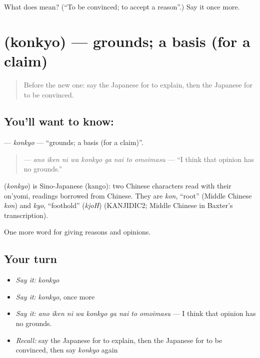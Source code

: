 \begin{tcolorbox}[breakable,colback=teal!4,colframe=teal!35!black,title={Before you move on}]
What does  mean? (\textquotedblleft{}To be convinced; to accept a reason\textquotedblright{}.) Say it once more.
\end{tcolorbox}
\section[\texorpdfstring{\ja{こんきょ} (konkyo)}{こんきょ (konkyo)}]{ (konkyo) — grounds; a basis (for a claim)}

\label{lesson:JA-C318-konkyo}



\begin{quote}
Before the new one: say the Japanese for to explain, then the Japanese for to be convinced.
\end{quote}

\subsection*{You'll want to know: }
\textbf{} — \emph{konkyo} — \textquotedblleft{}grounds; a basis (for a claim)\textquotedblright{}.

\begin{quote}
\textbf{    } — \emph{ano iken ni wa konkyo ga nai to omoimasu} — \textquotedblleft{}I think that opinion has no grounds.\textquotedblright{}
\end{quote}

\begin{cousinweb}
\textbf{} (\emph{konkyo}) is Sino-Japanese (kango): two Chinese characters read with their on'yomi, readings borrowed from Chinese. They are \emph{kon}, \textquotedblleft{}root\textquotedblright{} (Middle Chinese \emph{kon}) and \emph{kyo}, \textquotedblleft{}foothold\textquotedblright{} (\emph{kjoH}) (KANJIDIC2; Middle Chinese in Baxter's transcription).
\end{cousinweb}

\begin{grammarlens}[title={What you've built}]
One more word for giving reasons and opinions.
\end{grammarlens}

\subsection*{Your turn}
\begin{itemize}
\raggedright
  \item \emph{Say it:} \emph{konkyo}
  \item \emph{Say it:} \emph{konkyo}, once more
  \item \emph{Say it:} \emph{ano iken ni wa konkyo ga nai to omoimasu} — I think that opinion has no grounds.
  \item \emph{Recall:} say the Japanese for to explain, then the Japanese for to be convinced, then say \emph{konkyo} again
\end{itemize}

